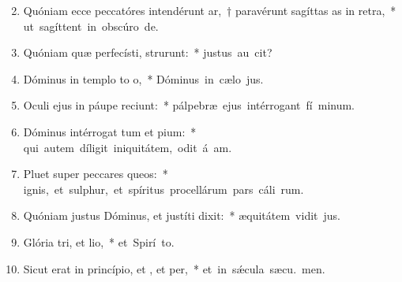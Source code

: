 \begin{flushleft}
\begin{enumerate}[leftmargin=*]
\setcounter{enumi}{1}

\item Quóniam ecce peccatóres intendérunt ar,~† paravérunt sagíttas as in retra,~* \mbox{ut sagíttent in obscúro  de.}

\item Quóniam quæ perfecísti, strurunt:~* \mbox{justus au  cit?}

\item Dóminus in templo to o,~* \mbox{Dóminus in cælo  jus.}

\item Oculi ejus in páupe reciunt:~* \mbox{pálpebræ ejus intérrogant fí minum.}

\item Dóminus intérrogat tum et pium:~* \mbox{qui autem díligit iniquitátem, odit á am.}

\item Pluet super peccares queos:~* \mbox{ignis, et sulphur, et spíritus procellárum pars cáli rum.}

\item Quóniam justus Dóminus, et justíti dixit:~* \mbox{æquitátem vidit  jus.}

\item Glória tri, et lio,~* \mbox{et Spirí to.}

\item Sicut erat in princípio, et , et per,~* \mbox{et in s\'{\ae}cula sæcu. men.}

\end{enumerate}
\end{flushleft}

